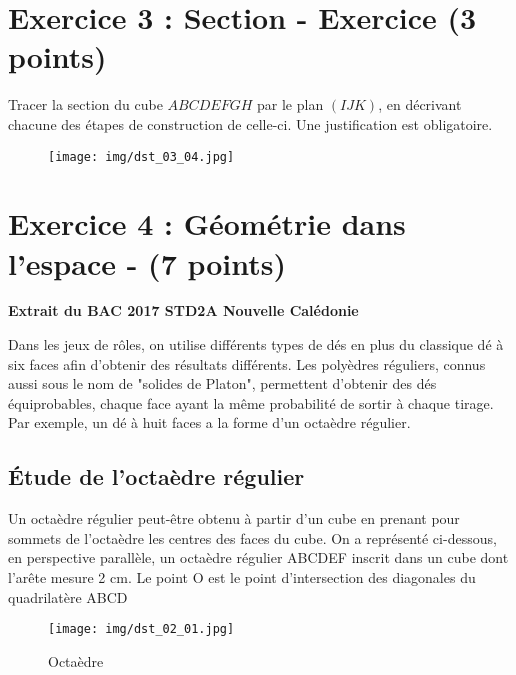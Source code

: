 \documentclass[answers]{exam}
\begin{document}
\section*{Exercice 3 : Section - Exercice (3 points)}

\begin{questions} 
  \question[3] Tracer la section du cube $ABCDEFGH$ par le plan $(IJK)$, en décrivant chacune des étapes de construction de celle-ci. Une justification est obligatoire.
\end{questions} 

\begin{figure}[H]
  \centering
  \texttt{[image: img/dst\_03\_04.jpg]}
\end{figure}

\section*{Exercice 4 : Géométrie dans l'espace - (7 points)}


\textbf{Extrait du BAC 2017 STD2A Nouvelle Calédonie} \par
\vspace{1em}
Dans les jeux de rôles, on utilise différents types de dés en plus du classique dé à six faces afin
d'obtenir des résultats différents. Les polyèdres réguliers, connus aussi sous le nom de "solides de
Platon", permettent d'obtenir des dés équiprobables, chaque face ayant la même probabilité de
sortir à chaque tirage. Par exemple, un dé à huit faces a la forme d'un octaèdre régulier.

\subsection*{Étude de l'octaèdre régulier}

Un octaèdre régulier peut-être obtenu à partir d'un cube en prenant pour sommets de l'octaèdre les centres des faces du cube.
On a représenté ci-dessous, en perspective parallèle, un octaèdre régulier ABCDEF inscrit dans un cube dont l'arête mesure 2 cm.
Le point O est le point d'intersection des diagonales du quadrilatère ABCD

\begin{figure}[H]
  \centering
  \texttt{[image: img/dst\_02\_01.jpg]}
  \caption{\label{} Octaèdre}
\end{figure}
\end{document}
